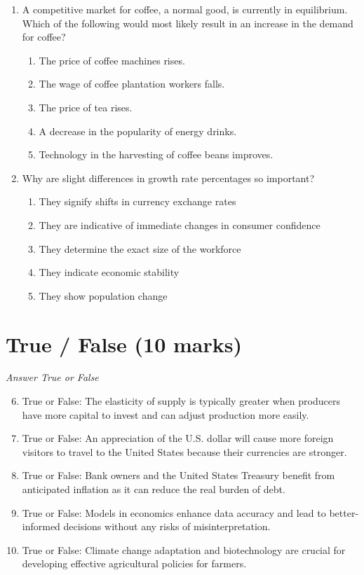 \documentclass[12pt]{article}
\begin{document}
\begin{enumerate}[label=\arabic*.]
\begin{enumerate}[label=(\alph*)]
    \item Compare AVC to MR.
    \item Compare AFC to MR.
    \item Shut down if the firm is not making a profit.
\end{enumerate}
\item A competitive market for coffee, a normal good, is currently in equilibrium. Which of the following would most likely result in an increase in the demand for coffee?
\begin{enumerate}[label=(\alph*)]
    \item The price of coffee machines rises.
    \item The wage of coffee plantation workers falls.
    \item The price of tea rises.
    \item A decrease in the popularity of energy drinks.
    \item Technology in the harvesting of coffee beans improves.
\end{enumerate}
\item Why are slight differences in growth rate percentages so important?
\begin{enumerate}[label=(\alph*)]
    \item They signify shifts in currency exchange rates
    \item They are indicative of immediate changes in consumer confidence
    \item They determine the exact size of the workforce
    \item They indicate economic stability
    \item They show population change
\end{enumerate}
\end{enumerate}

\section*{True / False (10 marks)}
\textit{Answer True or False}
\begin{enumerate}[label=\arabic*.]
\setcounter{enumi}{5}
\item True or False: The elasticity of supply is typically greater when producers have more capital to invest and can adjust production more easily.
\item True or False: An appreciation of the U.S. dollar will cause more foreign visitors to travel to the United States because their currencies are stronger.
\item True or False: Bank owners and the United States Treasury benefit from anticipated inflation as it can reduce the real burden of debt.
\item True or False: Models in economics enhance data accuracy and lead to better-informed decisions without any risks of misinterpretation.
\item True or False: Climate change adaptation and biotechnology are crucial for developing effective agricultural policies for farmers.
\end{enumerate}
\end{document}

